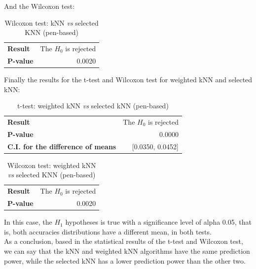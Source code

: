 \documentclass[12pt, a4paper]{article}
\begin{document}
And the Wilcoxon test:\\
\begin{table}[ht!]
	\centering
	\small
	\begin{tabular}{|lr|}
		\hline
		\textbf{Result} & The $H_0$ is rejected\\
		\textbf{P-value} & 0.0020\\
		\hline
	\end{tabular}
	\caption{Wilcoxon test: kNN \emph{vs} selected KNN (pen-based)}
\end{table}

Finally the results for the t-test and Wilcoxon test for weighted kNN and selected kNN:\\
\begin{table}[ht!]
	\centering
	\small
	\begin{tabular}{|lr|}
		\hline
		\textbf{Result} & The $H_0$ is rejected\\
		\textbf{P-value} & 0.0000\\
		\textbf{C.I. for the difference of means} & [0.0350, 0.0452]\\
		\hline
	\end{tabular}
	\caption{t-test: weighted kNN \emph{vs} selected kNN (pen-based)}
\end{table}
\begin{table}[ht!]
	\centering
	\small
	\begin{tabular}{|lr|}
		\hline
		\textbf{Result} & The $H_0$ is rejected\\
		\textbf{P-value} & 0.0020\\
		\hline
	\end{tabular}
	\caption{Wilcoxon test: weighted kNN \emph{vs} selected KNN (pen-based)}
\end{table}

In this case, the $H_1$ hypotheses is true with a significance level of alpha 0.05, that is, both accuracies distributions have a different mean, in both tests.\\

As a conclusion, based in the statistical results of the t-test and Wilcoxon test, we can say that the kNN and weighted kNN algorithms have the same prediction power, while the selected kNN has a lower prediction power than the other two.\\
\end{document}
